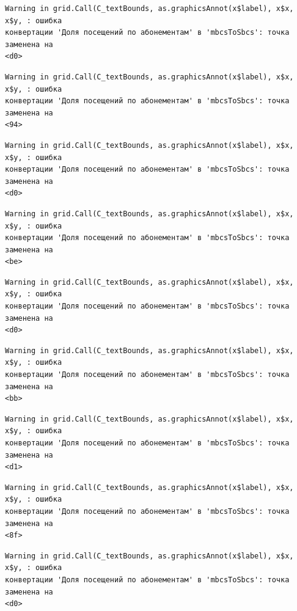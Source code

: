 \documentclass[
  letterpaper,
  DIV=11,
  numbers=noendperiod]{scrreprt}
\begin{document}
\begin{verbatim}
Warning in grid.Call(C_textBounds, as.graphicsAnnot(x$label), x$x, x$y, : ошибка
конвертации 'Доля посещений по абонементам' в 'mbcsToSbcs': точка заменена на
<d0>
\end{verbatim}

\begin{verbatim}
Warning in grid.Call(C_textBounds, as.graphicsAnnot(x$label), x$x, x$y, : ошибка
конвертации 'Доля посещений по абонементам' в 'mbcsToSbcs': точка заменена на
<94>
\end{verbatim}

\begin{verbatim}
Warning in grid.Call(C_textBounds, as.graphicsAnnot(x$label), x$x, x$y, : ошибка
конвертации 'Доля посещений по абонементам' в 'mbcsToSbcs': точка заменена на
<d0>
\end{verbatim}

\begin{verbatim}
Warning in grid.Call(C_textBounds, as.graphicsAnnot(x$label), x$x, x$y, : ошибка
конвертации 'Доля посещений по абонементам' в 'mbcsToSbcs': точка заменена на
<be>
\end{verbatim}

\begin{verbatim}
Warning in grid.Call(C_textBounds, as.graphicsAnnot(x$label), x$x, x$y, : ошибка
конвертации 'Доля посещений по абонементам' в 'mbcsToSbcs': точка заменена на
<d0>
\end{verbatim}

\begin{verbatim}
Warning in grid.Call(C_textBounds, as.graphicsAnnot(x$label), x$x, x$y, : ошибка
конвертации 'Доля посещений по абонементам' в 'mbcsToSbcs': точка заменена на
<bb>
\end{verbatim}

\begin{verbatim}
Warning in grid.Call(C_textBounds, as.graphicsAnnot(x$label), x$x, x$y, : ошибка
конвертации 'Доля посещений по абонементам' в 'mbcsToSbcs': точка заменена на
<d1>
\end{verbatim}

\begin{verbatim}
Warning in grid.Call(C_textBounds, as.graphicsAnnot(x$label), x$x, x$y, : ошибка
конвертации 'Доля посещений по абонементам' в 'mbcsToSbcs': точка заменена на
<8f>
\end{verbatim}

\begin{verbatim}
Warning in grid.Call(C_textBounds, as.graphicsAnnot(x$label), x$x, x$y, : ошибка
конвертации 'Доля посещений по абонементам' в 'mbcsToSbcs': точка заменена на
<d0>
\end{verbatim}
\end{document}
